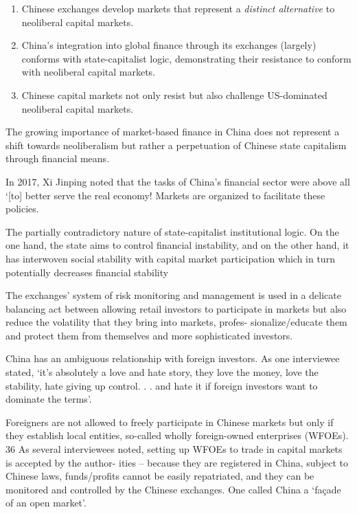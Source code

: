 \documentclass[
]{book}
\begin{document}
\begin{enumerate}
\def\labelenumi{\arabic{enumi}.}
\item
  Chinese exchanges develop markets that represent a \emph{distinct alternative} to neoliberal
  capital markets.
\item
  China's integration into global finance through its exchanges (largely) conforms
  with state-capitalist logic, demonstrating their resistance to conform with neoliberal
  capital markets.
\item
  Chinese capital markets not only resist
  but also challenge US-dominated neoliberal capital markets.
\end{enumerate}

The growing importance of market-based finance in China does not
represent a shift towards neoliberalism but rather a perpetuation of Chinese state capitalism
through financial means.

In 2017, Xi Jinping noted that the tasks of China's financial sector were
above all `{[}to{]} better serve the real economy!
Markets are organized to facilitate these policies.

The partially contradictory nature
of state-capitalist institutional logic. On the one hand, the state aims to control financial
instability, and on the other hand, it has interwoven social stability with capital market
participation which in turn potentially decreases financial stability

The exchanges' system of risk monitoring and management
is used in a delicate balancing act between allowing retail investors
to participate in markets but also reduce the volatility that they bring into markets, profes-
sionalize/educate them and protect them from themselves and more sophisticated investors.

China has an ambiguous relationship with foreign
investors. As one interviewee stated, `it's absolutely a love and hate story, they love the
money, love the stability, hate giving up control. . . and hate it if foreign investors want to
dominate the terms'.

Foreigners are not allowed to freely participate in Chinese markets but only if they
establish local entities, so-called wholly foreign-owned enterprises (WFOEs). 36 As several
interviewees noted, setting up WFOEs to trade in capital markets is accepted by the author-
ities -- because they are registered in China, subject to Chinese laws, funds/profits cannot be
easily repatriated, and they can be monitored and controlled by the Chinese exchanges.
One called China a `façade of an open market'.
\end{document}

